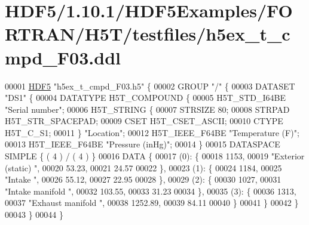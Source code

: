 \hypertarget{_h_d_f5_21_810_81_2_h_d_f5_examples_2_f_o_r_t_r_a_n_2_h5_t_2testfiles_2h5ex__t__cmpd___f03_8ddl_source}{}\section{H\+D\+F5/1.10.1/\+H\+D\+F5\+Examples/\+F\+O\+R\+T\+R\+A\+N/\+H5\+T/testfiles/h5ex\+\_\+t\+\_\+cmpd\+\_\+\+F03.ddl}
\label{_h_d_f5_21_810_81_2_h_d_f5_examples_2_f_o_r_t_r_a_n_2_h5_t_2testfiles_2h5ex__t__cmpd___f03_8ddl_source}

\begin{DoxyCode}
00001 \hyperlink{namespace_h_d_f5}{HDF5} \textcolor{stringliteral}{"h5ex\_t\_cmpd\_F03.h5"} \{
00002 GROUP \textcolor{stringliteral}{"/"} \{
00003    DATASET \textcolor{stringliteral}{"DS1"} \{
00004       DATATYPE  H5T\_COMPOUND \{
00005          H5T\_STD\_I64BE \textcolor{stringliteral}{"Serial number"};
00006          H5T\_STRING \{
00007             STRSIZE 80;
00008             STRPAD H5T\_STR\_SPACEPAD;
00009             CSET H5T\_CSET\_ASCII;
00010             CTYPE H5T\_C\_S1;
00011          \} \textcolor{stringliteral}{"Location"};
00012          H5T\_IEEE\_F64BE \textcolor{stringliteral}{"Temperature (F)"};
00013          H5T\_IEEE\_F64BE \textcolor{stringliteral}{"Pressure (inHg)"};
00014       \}
00015       DATASPACE  SIMPLE \{ ( 4 ) / ( 4 ) \}
00016       DATA \{
00017       (0): \{
00018             1153,
00019             \textcolor{stringliteral}{"Exterior (static)                                                               "},
00020             53.23,
00021             24.57
00022          \},
00023       (1): \{
00024             1184,
00025             \textcolor{stringliteral}{"Intake                                                                          "},
00026             55.12,
00027             22.95
00028          \},
00029       (2): \{
00030             1027,
00031             \textcolor{stringliteral}{"Intake manifold                                                                 "},
00032             103.55,
00033             31.23
00034          \},
00035       (3): \{
00036             1313,
00037             \textcolor{stringliteral}{"Exhaust manifold                                                                "},
00038             1252.89,
00039             84.11
00040          \}
00041       \}
00042    \}
00043 \}
00044 \}
\end{DoxyCode}
